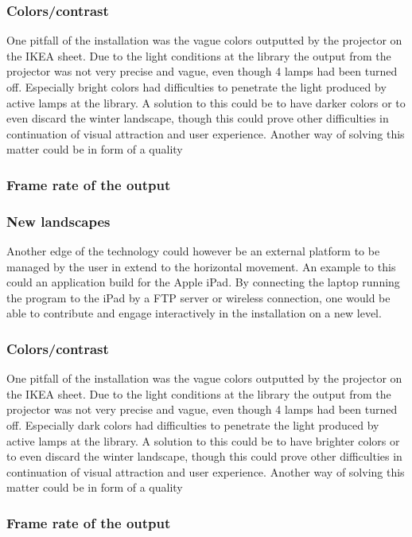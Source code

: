 \subsubsection{Colors/contrast}
One pitfall of the installation was the vague colors outputted by the projector on the IKEA sheet. Due to the light conditions at the library the output from the projector was not very precise and vague, even though 4 lamps had been turned off. Especially bright colors had difficulties to penetrate the light produced by active lamps at the library. A solution to this could be to have darker colors or to even discard the winter landscape, though this could prove other difficulties in continuation of visual attraction and user experience. Another way of solving this matter could be in form of a quality 
\subsubsection{Frame rate of the output}
\subsubsection{New landscapes}  
Another edge of the technology could however be an external platform to be managed by the user in extend to the horizontal movement. An example to this could an application build for the Apple iPad. By connecting the laptop running the program to the iPad by a FTP server or wireless connection, one would be able to contribute and engage interactively in the installation on a new level.

\subsubsection{Colors/contrast}
One pitfall of the installation was the vague colors outputted by the projector on the IKEA sheet. Due to the light conditions at the library the output from the projector was not very precise and vague, even though 4 lamps had been turned off. Especially dark colors had difficulties to penetrate the light produced by active lamps at the library. A solution to this could be to have brighter colors or to even discard the winter landscape, though this could prove other difficulties in continuation of visual attraction and user experience. Another way of solving this matter could be in form of a quality 
\subsubsection{Frame rate of the output}
